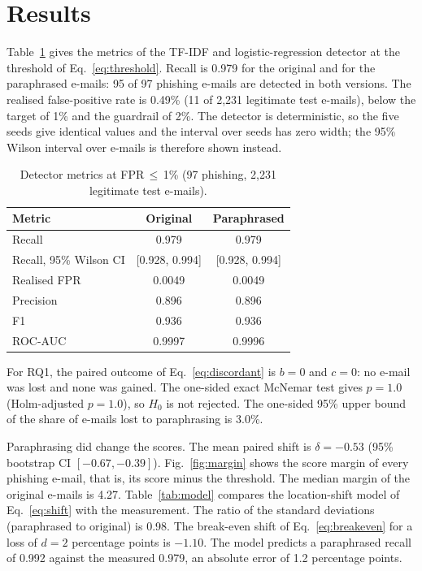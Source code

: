 \section{Results}
\label{sec:results}

Table~\ref{tab:metrics} gives the metrics of the TF-IDF and logistic-regression detector at the threshold of Eq.~\eqref{eq:threshold}. Recall is 0.979 for the original and for the paraphrased e-mails: 95 of 97 phishing e-mails are detected in both versions. The realised false-positive rate is 0.49\% (11 of 2,231 legitimate test e-mails), below the target of 1\% and the guardrail of 2\%. The detector is deterministic, so the five seeds give identical values and the interval over seeds has zero width; the 95\% Wilson interval over e-mails is therefore shown instead.

\begin{table}[t]
\caption{Detector metrics at FPR$\,\le\,$1\% (97 phishing, 2,231 legitimate test e-mails).}
\label{tab:metrics}
\centering
\small
\begin{tabular}{@{}lcc@{}}
\toprule
Metric & Original & Paraphrased \\
\midrule
Recall & 0.979 & 0.979 \\
Recall, 95\% Wilson CI & [0.928, 0.994] & [0.928, 0.994] \\
Realised FPR & 0.0049 & 0.0049 \\
Precision & 0.896 & 0.896 \\
F1 & 0.936 & 0.936 \\
ROC-AUC & 0.9997 & 0.9996 \\
\bottomrule
\end{tabular}
\end{table}

For RQ1, the paired outcome of Eq.~\eqref{eq:discordant} is $b=0$ and $c=0$: no e-mail was lost and none was gained. The one-sided exact McNemar test gives $p=1.0$ (Holm-adjusted $p=1.0$), so $H_0$ is not rejected. The one-sided 95\% upper bound of the share of e-mails lost to paraphrasing is 3.0\%.

Paraphrasing did change the scores. The mean paired shift is $\delta=-0.53$ (95\% bootstrap CI $[-0.67,-0.39]$). Fig.~\ref{fig:margin} shows the score margin of every phishing e-mail, that is, its score minus the threshold. The median margin of the original e-mails is 4.27. Table~\ref{tab:model} compares the location-shift model of Eq.~\eqref{eq:shift} with the measurement. The ratio of the standard deviations (paraphrased to original) is 0.98. The break-even shift of Eq.~\eqref{eq:breakeven} for a loss of $d=2$ percentage points is $-1.10$. The model predicts a paraphrased recall of 0.992 against the measured 0.979, an absolute error of 1.2 percentage points.

